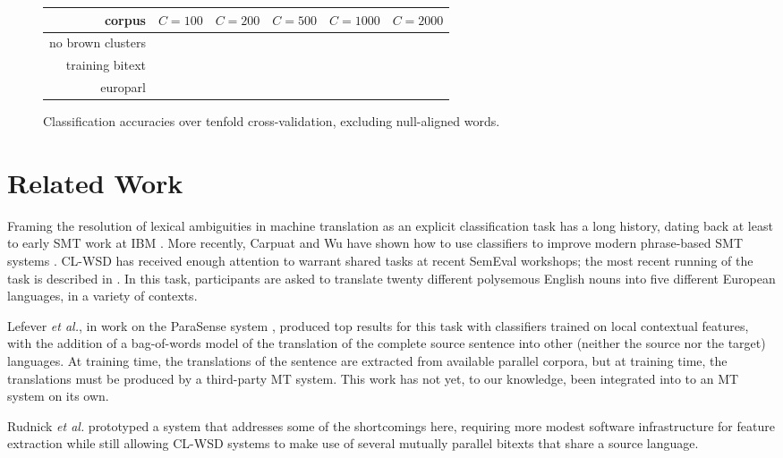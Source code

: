 \documentclass[10pt, a4paper]{article}
\begin{document}
\begin{figure*}[t!]
  \begin{center}
  \begin{tabular}{|r|r|r|r|r|r|}
    \hline
    corpus          & $C=100$ & $C=200$ & $C=500$ & $C=1000$ & $C=2000$ \\
    \hline
    no brown clusters &    & & & &  \\
    training bitext &                            &         &         &          &          \\
    europarl        &                            &         &         &          &          \\
    \hline
  \end{tabular}
  \end{center}
\caption{Classification accuracies over tenfold cross-validation, excluding
null-aligned words.}
\label{fig:theresults2}
\end{figure*}


\section{Related Work}
Framing the resolution of lexical ambiguities in machine translation
as an explicit classification
task has a long history, dating back at least to early SMT work at IBM
\cite{Brown91word-sensedisambiguation}.  More recently, Carpuat and Wu have
shown how to use classifiers to improve modern phrase-based SMT systems
\cite{carpuatpsd}.
CL-WSD has received enough attention to warrant shared tasks at recent SemEval
workshops; the most recent running of the task is described in \cite{task10}.
In this task, participants are asked to translate twenty different polysemous
English nouns into five different European languages, in a variety of contexts.

Lefever \emph{et al.}, in work on the ParaSense system
, produced top results for
this task with classifiers trained on local contextual features, with the 
addition of a bag-of-words model of the translation of the complete source
sentence into other (neither the source nor the target) languages. At training
time, the translations of the sentence are extracted from available parallel
corpora, but at training time, the translations must be produced by a
third-party MT system.
This work has not yet, to our knowledge, been integrated into to an MT system
on its own.

Rudnick \emph{et al.} 
prototyped a system that addresses some of the shortcomings here, requiring
more modest software infrastructure for feature extraction while still allowing
CL-WSD systems to make use of several mutually parallel bitexts that share a
source language.
\end{document}
